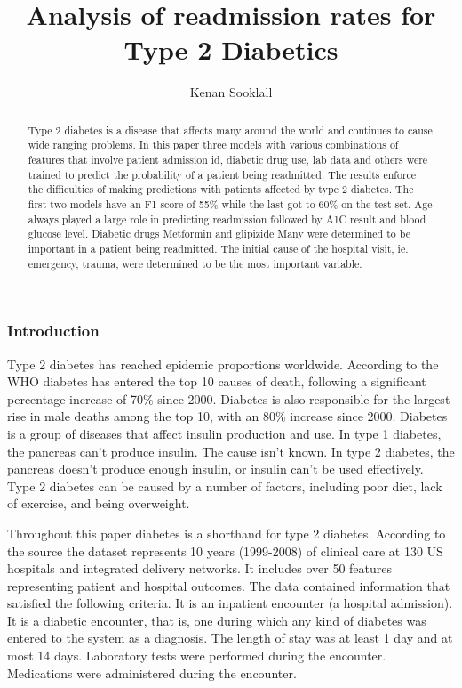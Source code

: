 \documentclass[5p]{elsarticle} %
\begin{document}
\begin{frontmatter}

  \title{Analysis of readmission rates for Type 2 Diabetics}
    \author[CUNY-SPS]{Kenan Sooklall}
  
  \begin{abstract}
  Type 2 diabetes is a disease that affects many around the world and
  continues to cause wide ranging problems. In this paper three models
  with various combinations of features that involve patient admission
  id, diabetic drug use, lab data and others were trained to predict the
  probability of a patient being readmitted. The results enforce the
  difficulties of making predictions with patients affected by type 2
  diabetes. The first two models have an F1-score of 55\% while the last
  got to 60\% on the test set. Age always played a large role in
  predicting readmission followed by A1C result and blood glucose level.
  Diabetic drugs Metformin and glipizide Many were determined to be
  important in a patient being readmitted. The initial cause of the
  hospital visit, ie. emergency, trauma, were determined to be the most
  important variable.
  \end{abstract}
  
 \end{frontmatter}

\hypertarget{introduction}{%
\subsubsection{Introduction}\label{introduction}}

Type 2 diabetes has reached epidemic proportions worldwide. According to
the WHO diabetes has entered the top 10 causes of death, following a
significant percentage increase of 70\% since 2000. Diabetes is also
responsible for the largest rise in male deaths among the top 10, with
an 80\% increase since 2000. Diabetes is a group of diseases that affect
insulin production and use. In type 1 diabetes, the pancreas can't
produce insulin. The cause isn't known. In type 2 diabetes, the pancreas
doesn't produce enough insulin, or insulin can't be used effectively.
Type 2 diabetes can be caused by a number of factors, including poor
diet, lack of exercise, and being overweight.

Throughout this paper diabetes is a shorthand for type 2 diabetes.
According to the source the dataset represents 10 years (1999-2008) of
clinical care at 130 US hospitals and integrated delivery networks. It
includes over 50 features representing patient and hospital outcomes.
The data contained information that satisfied the following criteria. It
is an inpatient encounter (a hospital admission). It is a diabetic
encounter, that is, one during which any kind of diabetes was entered to
the system as a diagnosis. The length of stay was at least 1 day and at
most 14 days. Laboratory tests were performed during the encounter.
Medications were administered during the encounter.
\end{document}
